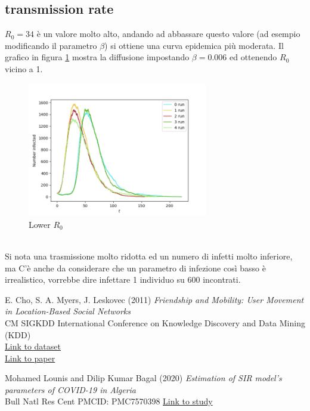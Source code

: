 \documentclass[a4paper]{article}
\begin{document}
\subsection{transmission rate}
$R_0 = 34$ è un valore molto alto, andando ad abbassare questo valore (ad esempio modificando il parametro $\beta$) si ottiene una curva epidemica più moderata.
Il grafico in figura \ref{FIG:transmission_rate_06_1_random} mostra la diffusione impostando $\beta = 0.006$ ed ottenendo $R_0$ vicino a 1.\\
\begin{figure}[!ht]
\centering
\includegraphics[width=0.7\textwidth]{transmission_rate_06_1_random.png}
\caption{Lower $R_0$} \label{FIG:transmission_rate_06_1_random}
\end{figure}\\
Si nota una trasmissione molto ridotta ed un numero di infetti molto inferiore, ma C'è anche da considerare che un parametro di infezione così basso è irrealistico, vorrebbe dire infettare 1 individuo su 600 incontrati.


\newpage
\begin{thebibliography}{9}

E. Cho, S. A. Myers, J. Leskovec (2011) \emph{Friendship and Mobility: User Movement in Location-Based Social Networks}\\
CM SIGKDD International Conference on Knowledge Discovery and Data Mining (KDD)\\
\href{http://snap.stanford.edu/data/loc-brightkite.html}{Link to dataset}\\
\href{https://cs.stanford.edu/people/jure/pubs/mobile-kdd11.pdf}{Link to paper}

Mohamed Lounis and Dilip Kumar Bagal (2020) \emph{Estimation of SIR model’s parameters of COVID-19 in Algeria}\\
Bull Natl Res Cent PMCID: PMC7570398
\href{https://www.ncbi.nlm.nih.gov/pmc/articles/PMC7570398/}{Link to study}
\end{thebibliography}
\end{document}
